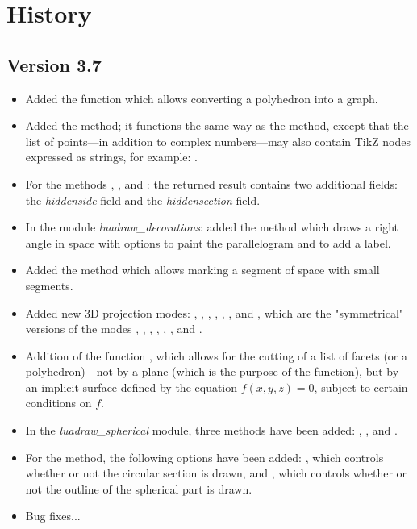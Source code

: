 \section{History}
\subsection{Version 3.7}
\begin{itemize}
    \item Added the function  which allows converting a polyhedron into a graph.
    
    \item Added the  method; it functions the same way as the  method, except that the list of points—in addition to complex numbers—may also contain TikZ nodes expressed as strings, for example: .

    \item For the methods , , and : the returned result contains two additional fields: the \emph{hiddenside} field and the \emph{hiddensection} field.
    
    \item In the module \emph{luadraw\_decorations}: added the method  which draws a right angle in space with options to paint the parallelogram and to add a label.
    
    \item Added the method  which allows marking a segment of space with small segments.
    
    \item Added new 3D projection modes: , , , , , , and , which are the "symmetrical" versions of the modes , , , , , , and .
    
    \item Addition of the function , which allows for the cutting of a list of facets (or a polyhedron)—not by a plane (which is the purpose of the  function), but by an implicit surface defined by the equation $f(x,y,z)=0$, subject to certain conditions on $f$.
    
    \item In the \emph{luadraw\_spherical} module, three methods have been added: , , and .

    \item For the  method, the following options have been added: , which controls whether or not the circular section is drawn, and , which controls whether or not the outline of the spherical part is drawn.
    
    \item Bug fixes...    
\end{itemize}

